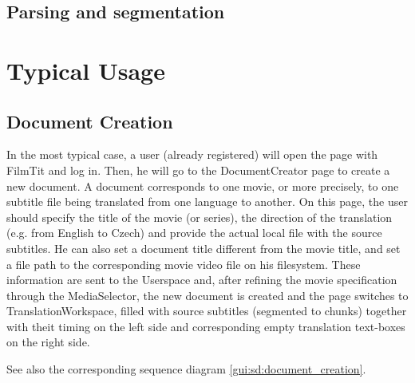\subsection{Parsing and segmentation}

\section{Typical Usage}


\subsection{Document Creation}

In the most typical case, a user (already registered) will open the page with FilmTit and log in. Then, he will go to the DocumentCreator page to create a new document. A document corresponds to one movie, or more precisely, to one subtitle file being translated from one language to another. On this page, the user should specify the title of the movie (or series), the direction of the translation (e.g. from English to Czech) and provide the actual local file with the source subtitles. He can also set a document title different from the movie title, and set a file path to the corresponding movie video file on his filesystem.
These information are sent to the Userspace and, after refining the movie specification through the MediaSelector, the new document is created and the page switches to TranslationWorkspace, filled with source subtitles (segmented to chunks) together with theit timing on the left side and corresponding empty translation text-boxes on the right side.

See also the corresponding sequence diagram \ref{gui:sd:document_creation}.

